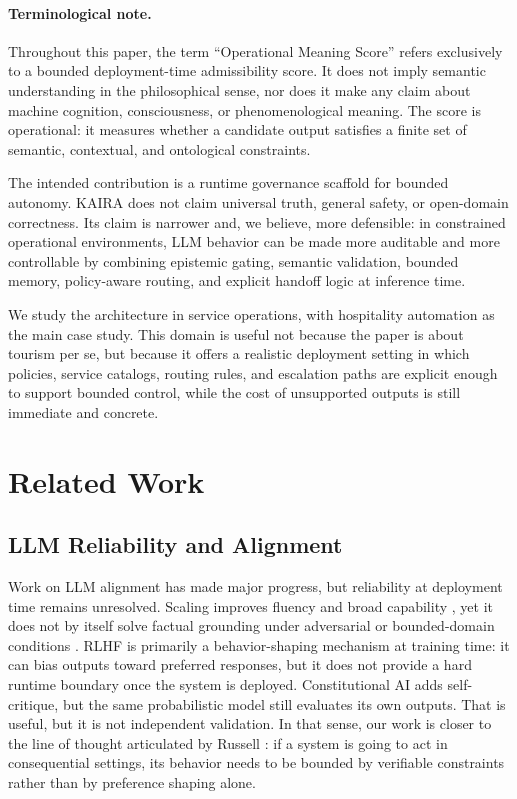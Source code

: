 \documentclass[11pt,a4paper]{article}
\begin{document}
\paragraph{Terminological note.} Throughout this paper, the term ``Operational Meaning Score'' refers exclusively to a bounded deployment-time admissibility score. It does not imply semantic understanding in the philosophical sense, nor does it make any claim about machine cognition, consciousness, or phenomenological meaning. The score is operational: it measures whether a candidate output satisfies a finite set of semantic, contextual, and ontological constraints.

The intended contribution is a runtime governance scaffold for bounded autonomy. KAIRA does not claim universal truth, general safety, or open-domain correctness. Its claim is narrower and, we believe, more defensible: in constrained operational environments, LLM behavior can be made more auditable and more controllable by combining epistemic gating, semantic validation, bounded memory, policy-aware routing, and explicit handoff logic at inference time.

We study the architecture in service operations, with hospitality automation as the main case study. This domain is useful not because the paper is about tourism per se, but because it offers a realistic deployment setting in which policies, service catalogs, routing rules, and escalation paths are explicit enough to support bounded control, while the cost of unsupported outputs is still immediate and concrete.

\section{Related Work}

\subsection{LLM Reliability and Alignment}
Work on LLM alignment has made major progress, but reliability at deployment time remains unresolved. Scaling improves fluency and broad capability \cite{kaplan2020}, yet it does not by itself solve factual grounding under adversarial or bounded-domain conditions \cite{lin2022}. RLHF \cite{ouyang2022} is primarily a behavior-shaping mechanism at training time: it can bias outputs toward preferred responses, but it does not provide a hard runtime boundary once the system is deployed. Constitutional AI \cite{bai2022} adds self-critique, but the same probabilistic model still evaluates its own outputs. That is useful, but it is not independent validation. In that sense, our work is closer to the line of thought articulated by Russell \cite{russell2019}: if a system is going to act in consequential settings, its behavior needs to be bounded by verifiable constraints rather than by preference shaping alone.
\end{document}
